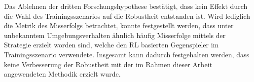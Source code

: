 Das Ablehnen der dritten Forschungshypothese bestätigt, dass kein Effekt durch die Wahl des Trainingsszenarios auf die Robustheit entstanden ist.
Wird lediglich die Metrik des Misserfolgs betrachtet, konnte festgestellt werden, dass unter unbekanntem Umgebungsverhalten ähnlich häufig Misserfolge mittels der Strategie erzielt worden sind, welche den RL basierten Gegenspieler im Trainingsszenario verwendete.
Insgesamt kann dadurch festgehalten werden, dass keine Verbesserung der Robustheit mit der im Rahmen dieser Arbeit angewendeten Methodik erzielt wurde.
